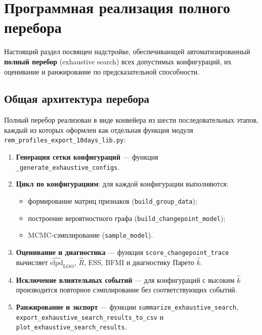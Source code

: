 \documentclass[14pt]{mmcs_article}
\begin{document}
	
	
	\section{Программная реализация полного перебора}
	
	Настоящий раздел посвящен надстройке,
	обеспечивающей автоматизированный \textbf{полный перебор}
	(exhaustive search) всех допустимых конфигураций, их
	оценивание и ранжирование по предсказательной способности.
	
	\subsection*{Общая архитектура перебора}
	
	Полный перебор реализован в виде конвейера из шести
	последовательных этапов, каждый из которых оформлен как
	отдельная функция модуля
	\texttt{rem\_profiles\_export\_10days\_lib.py}:
	
	\begin{enumerate}
		\item \textbf{Генерация сетки конфигураций} — функция\linebreak
		\texttt{\_generate\_exhaustive\_configs}.
		\item \textbf{Цикл по конфигурациям}: для каждой
		конфигурации выполняются:
		\begin{itemize}
			\item формирование матриц признаков
			(\texttt{build\_group\_data});
			\item построение вероятностного графа
			(\texttt{build\_changepoint\_model});
			\item MCMC-сэмплирование
			(\texttt{sample\_model}).
		\end{itemize}
		\item \textbf{Оценивание и диагностика} — функция
		\texttt{score\_changepoint\_trace} вычисляет
		$\widehat{\mathrm{elpd}}_{\mathrm{LOO}}$,
		$\hat{R}$, ESS, BFMI и диагностику Парето $\hat{k}$.
		\item \textbf{Исключение влиятельных событий} — для
		конфигураций с высоким $\hat{k}$ производится
		повторное сэмплирование без соответствующих событий.
		\item \textbf{Ранжирование и экспорт} — функции
		\texttt{summarize\_exhaustive\_search},
		\texttt{export\_exhaustive\_search\_results\_to\_csv}
		и \linebreak\texttt{plot\_exhaustive\_search\_results}.
	\end{enumerate}
	
\end{document}
